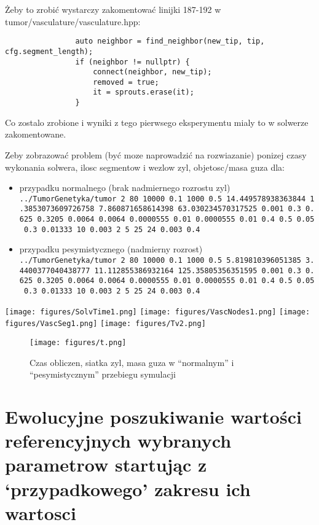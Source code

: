 \documentclass[]{article}
\providecommand{\tightlist}{%
  \setlength{\itemsep}{0pt}\setlength{\parskip}{0pt}}
\begin{document}
Żeby to zrobić wystarczy zakomentować linijki 187-192 w
tumor/vasculature/vasculature.hpp:

\begin{verbatim}
                auto neighbor = find_neighbor(new_tip, tip, cfg.segment_length);
                if (neighbor != nullptr) {
                    connect(neighbor, new_tip);
                    removed = true;
                    it = sprouts.erase(it);
                }
\end{verbatim}

Co zostalo zrobione i wyniki z tego pierwsego eksperymentu mialy to w
solwerze zakomentowane.

Zeby zobrazować problem (być moze naprowadzić na rozwiazanie) ponizej
czasy wykonania solwera, ilosc segmentow i wezlow zyl, objetosc/masa
guza dla:

\begin{itemize}
\tightlist
\item
  przypadku normalnego (brak nadmiernego rozrostu zyl)
  \texttt{../TumorGenetyka/tumor\ 2\ 80\ 10000\ 0.1\ 1000\ 0.5\ 14.449578938363844\ 1.3853073609726758\ 7.860871658614398\ 63.030234570317525\ 0.001\ 0.3\ 0.625\ 0.3205\ 0.0064\ 0.0064\ 0.0000555\ 0.01\ 0.0000555\ 0.01\ 0.4\ 0.5\ 0.05\ 0.3\ 0.01333\ 10\ 0.003\ 2\ 5\ 25\ 24\ 0.003\ 0.4}
\item
  przypadku pesymistycznego (nadmierny rozrost)
  \texttt{../TumorGenetyka/tumor\ 2\ 80\ 10000\ 0.1\ 1000\ 0.5\ 5.819810396051385\ 3.4400377040438777\ 11.112855386932164\ 125.35805356351595\ 0.001\ 0.3\ 0.625\ 0.3205\ 0.0064\ 0.0064\ 0.0000555\ 0.01\ 0.0000555\ 0.01\ 0.4\ 0.5\ 0.05\ 0.3\ 0.01333\ 10\ 0.003\ 2\ 5\ 25\ 24\ 0.003\ 0.4}
\end{itemize}

\texttt{[image: figures/SolvTime1.png]}
\texttt{[image: figures/VascNodes1.png]}
\texttt{[image: figures/VascSeg1.png]}
\texttt{[image: figures/Tv2.png]}

\begin{figure}[htbp]
\centering
\texttt{[image: figures/t.png]}
\caption{Czas obliczen, siatka zyl, masa guza w ``normalnym'' i
``pesymistycznym'' przebiegu symulacji\label{fig:first}}
\end{figure}

\section{\texorpdfstring{Ewolucyjne poszukiwanie wartości referencyjnych
wybranych parametrow startując z `przypadkowego' zakresu ich
wartosci}{Ewolucyjne poszukiwanie wartości referencyjnych wybranych parametrow startując z przypadkowego zakresu ich wartosci}}\label{ewolucyjne-poszukiwanie-wartoux15bci-referencyjnych-wybranych-parametrow-startujux105c-z-przypadkowego-zakresu-ich-wartosci}
\end{document}

